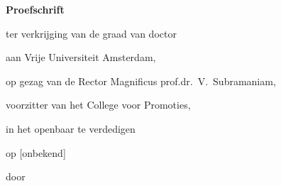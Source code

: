 \begin{titlepage}

\begin{center}

\vspace*{2\bigskipamount}

{\makeatletter
\titlestyle\bfseries\LARGE\@title
\makeatother}

{\makeatletter
\ifx\@subtitle\undefined\else
    \bigskip
    \titlefont\titleshape\Large\@subtitle
\fi
\makeatother}

\end{center}

\cleardoublepage
\thispagestyle{empty}

\begin{center}


\vspace*{2\bigskipamount}

{\makeatletter
\titlestyle\bfseries\LARGE\@title
\makeatother}

{\makeatletter
\ifx\@subtitle\undefined\else
    \bigskip
    \titlefont\titleshape\Large\@subtitle
\fi
\makeatother}

\vfill


{\Large\titlefont\bfseries Proefschrift}

\bigskip
\bigskip

ter verkrijging van de graad van doctor

aan Vrije Universiteit Amsterdam,

op gezag van de Rector Magnificus prof.dr.~V.~Subramaniam,

voorzitter van het College voor Promoties,

in het openbaar te verdedigen

op [onbekend]

\bigskip
\bigskip

door

\bigskip
\bigskip

\makeatletter
{\Large\titlefont\bfseries\@firstname\ \titleshape{\MakeUppercase{\@lastname}}}
\makeatother


\end{center}
\end{titlepage}
